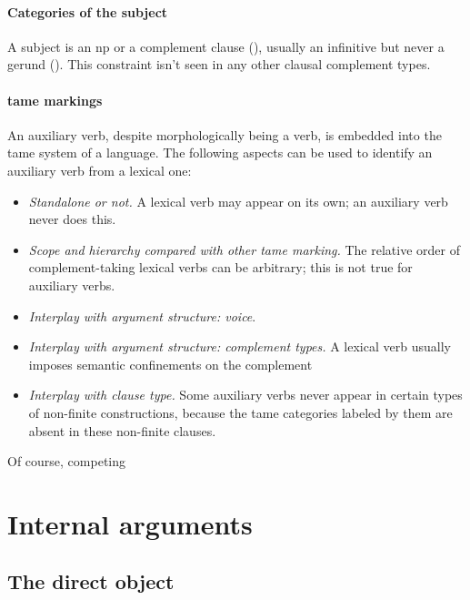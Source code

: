 \documentclass[a4paper, oneside, 12pt]{report}
\begin{document}
\paragraph*{Categories of the subject} A subject is an \ac{np}  
or a complement clause (), 
usually an infinitive but never a gerund ().
This constraint isn't seen in any other clausal complement types.

\paragraph*{\ac{tame} markings}

An auxiliary verb, despite morphologically being a verb, 
is embedded into the \ac{tame} system of a language.
The following aspects can be used to identify 
an auxiliary verb from a lexical one:
\begin{itemize}
    \item \emph{Standalone or not.} A lexical verb may appear on its own;
    an auxiliary verb never does this.
    \item \emph{Scope and hierarchy compared with other \ac{tame} marking.} 
    The relative order of complement-taking lexical verbs can be arbitrary;
    this is not true for auxiliary verbs. 
    \item \emph{Interplay with argument structure: voice}.
    \item \emph{Interplay with argument structure: complement types.} 
    A lexical verb usually imposes semantic confinements on the complement 
    \item \emph{Interplay with clause type.} 
    Some auxiliary verbs never appear in certain types of non-finite constructions, 
    because the \ac{tame} categories labeled by them 
    are absent in these non-finite clauses.
\end{itemize}
Of course, competing  


\section{Internal arguments}

\subsection{The direct object}\label{sec:vp.complement.direct-object}
\end{document}
